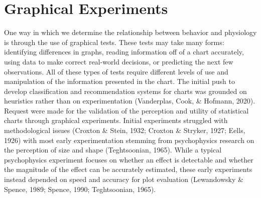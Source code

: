 \documentclass[print]{nuthesis}
\begin{document}
\hypertarget{graphical-experiments}{%
\section{Graphical Experiments}\label{graphical-experiments}}

One way in which we determine the relationship between behavior and physiology is through the use of graphical tests. These tests may take many forms: identifying differences in graphs, reading information
off of a chart accurately, using data to make correct real-world decisions, or predicting the next few observations.
All of these types of tests require different levels of use and manipulation of the information presented in the chart.
The initial push to develop classification and recommendation systems for charts was grounded on heuristics rather than on experimentation (Vanderplas, Cook, \& Hofmann, 2020).
Request were made for the validation of the perception and utility of statistical charts through graphical experiments.
Initial experiments struggled with methodological issues (Croxton \& Stein, 1932; Croxton \& Stryker, 1927; Eells, 1926) with most early experimentation stemming from psychophysics research on the perception of size and shape (Teghtsoonian, 1965).
While a typical psychophysics experiment focuses on whether an effect is detectable and whether the magnitude of the effect can be accurately estimated, these early experiments instead depended on speed and accuracy for plot evaluation (Lewandowsky \& Spence, 1989; Spence, 1990; Teghtsoonian, 1965).
\end{document}
